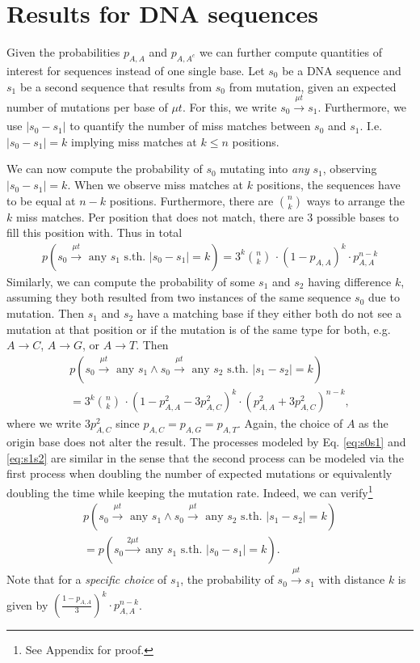 \documentclass[12pt]{article}
\begin{document}
\section{Results for DNA sequences}
Given the probabilities $p_{A,A}$ and $p_{A,A^c}$ we can further compute quantities of interest for sequences instead of one single base. 
Let $s_0$ be a DNA sequence and $s_1$ be a second sequence that results from $s_0$ from mutation, given an expected number of mutations per base of $\mu t$. For this, we write $s_0\xrightarrow[]{\mu t} s_1$. Furthermore, we use $|s_0 -s_1|$ to quantify the number of miss matches between $s_0$ and $s_1$. I.e. $|s_0-s_1|=k$ implying miss matches at $k\leq n$ positions.

We can now compute the probability of $s_0$ mutating into \textit{any} $s_1$, observing $|s_0-s_1|=k$. When we observe miss matches at $k$ positions, the sequences have to be equal at $n-k$ positions. Furthermore, there are $\binom{n}{k}$ ways to arrange the $k$ miss matches. Per position that does not match, there are 3 possible bases to fill this position with. Thus in total
\begin{align}
	p(s_0 \xrightarrow[]{\mu t} \text{ any } s_1 \text{ s.th. } |s_0-s_1|=k) =3^k \binom{n}{k} \, \cdot  \left(1-p_{A,A}\right)^{k}\cdot p_{A,A}^{n-k} \label{eq:s0s1}
\end{align}
Similarly, we can compute the probability of some $s_1$ and $s_2$ having difference $k$, assuming they both resulted from two instances of the same sequence $s_0$ due to mutation. Then $s_1$ and $s_2$ have a matching base if they either both do not see a mutation at that position or if the mutation is of the same type for both, e.g. $A\rightarrow C$, $A\rightarrow G$, or $A\rightarrow T$. Then
\begin{align}
p(s_0 \xrightarrow[]{\mu t} \text{ any } s_1  \wedge s_0 \xrightarrow[]{\mu t} \text{ any } s_2  \text{ s.th. } |s_1-s_2|=k) \nonumber \\
 = 3^k\binom{n}{k} \, \cdot \left(1-p_{A,A}^2 -3p_{A,C}^2\right)^{k}\cdot \left(p_{A,A}^2 +3p_{A,C}^2\right)^{n-k},\label{eq:s1s2}
\end{align}
where we write $3p_{A,C}^2$ since $p_{A,C} = p_{A,G}=p_{A,T}$. Again, the choice of $A$ as the origin base does not alter the result. The processes modeled by Eq. \eqref{eq:s0s1} and \eqref{eq:s1s2} are similar in the sense that the second process can be modeled via the first process when doubling the number of expected mutations or equivalently doubling the time while keeping the mutation rate. Indeed, we can verify\footnote{See Appendix for proof.}
\begin{align}
p(s_0 \xrightarrow[]{\mu t} \text{ any } s_1  \wedge s_0 \xrightarrow[]{\mu t}\text{ any } s_2  \text{ s.th. } |s_1-s_2|=k) \nonumber \\ 
= p(s_0 \xrightarrow[]{2 \mu t} \text{ any } s_1 \text{ s.th. } |s_0-s_1|=k).
\label{eq:s1s2equivelence}
\end{align}
Note that for a \textit{specific choice} of $s_1$, the probability of $s_0 \xrightarrow[]{\mu t} s_1$ with distance $k$ is given by $\left(\frac{1-p_{A,A}}{3}\right)^k \cdot p_{A,A}^{n-k}$.
\end{document}
